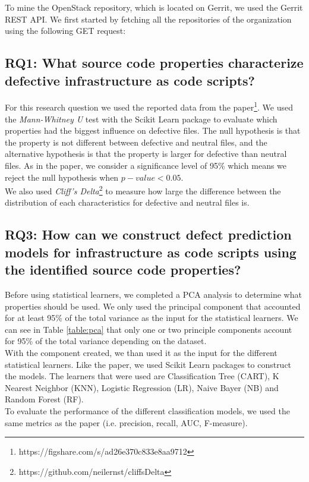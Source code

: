 To mine the OpenStack repository, which is located on Gerrit, we used the Gerrit REST API. We first started by fetching all the repositories of the organization using the following GET request:

\subsection{RQ1: What source code properties characterize defective infrastructure as code scripts?}
For this research question we used the reported data from the
paper\footnote{https://figshare.com/s/ad26e370c833e8aa9712}.
We used the \emph{Mann-Whitney U} test with the Scikit Learn package
to evaluate which properties had the biggest influence on defective files.
The null hypothesis is that the property is not different between defective and
neutral files, and the alternative hypothesis is that the property is larger for
defective than neutral files. As in the paper, we consider a significance level of
95\% which means we reject the null hypothesis when $ p-value < 0.05 $. \\

We also used \emph{Cliff's Delta}\footnote{https://github.com/neilernst/cliffsDelta}
to measure how large the difference between the distribution of each characteristics
for defective and neutral files is.

\subsection{RQ3: How can we construct defect prediction models for
    infrastructure as code scripts using the identified source code properties?}
Before using statistical learners, we completed a PCA analysis to determine
what properties should be used. We only used the principal component that accounted
for at least 95\% of the total variance as the input for the statistical learners.
We can see in Table \ref{table:pca} that only one or two principle components
account for 95\% of the total variance depending on the dataset. \\

With the component created, we than used it as the input for the different
statistical learners. Like the paper, we used Scikit Learn packages to construct
the models. The learners that were used are Classification Tree (CART),
K Nearest Neighbor (KNN), Logistic Regression (LR), Naive Bayer (NB) and
Random Forest (RF). \\

To evaluate the performance of the different classification models, we used the
same metrics as the paper (i.e. precision, recall, AUC, F-measure).
